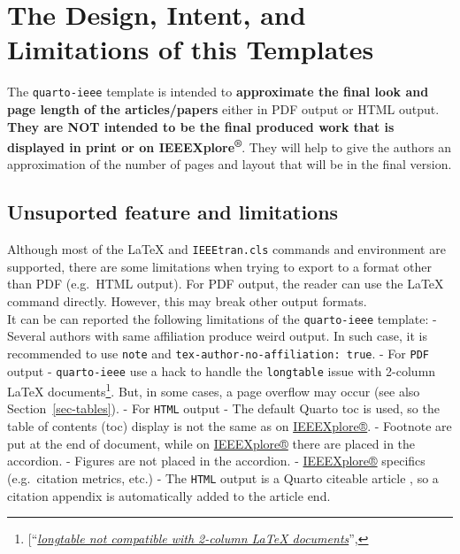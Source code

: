 \documentclass[
  journal,
]{IEEEtran}%
\theoremstyle{plain}
\theoremstyle{remark}
\begin{document}
\section{The Design, Intent, and Limitations of this
Templates}\label{the-design-intent-and-limitations-of-this-templates}

The \texttt{quarto-ieee} template is intended to \textbf{approximate the
final look and page length of the articles/papers} either in PDF output
or HTML output. \textbf{They are NOT intended to be the final produced
work that is displayed in print or on IEEEXplore\textsuperscript{®}}.
They will help to give the authors an approximation of the number of
pages and layout that will be in the final version.

\subsection{Unsuported feature and
limitations}\label{unsuported-feature-and-limitations}

Although most of the {\LaTeX} and \texttt{IEEEtran.cls} commands and
environment are supported, there are some limitations when trying to
export to a format other than PDF (e.g.~HTML output). For PDF output,
the reader can use the {\LaTeX} command directly. However, this may
break other output formats.\\
It can be can reported the following limitations of the
\texttt{quarto-ieee} template: - Several authors with same affiliation
produce weird output. In such case, it is recommended to use
\texttt{note} and \texttt{tex-author-no-affiliation:\ true}. - For
\texttt{PDF} output - \texttt{quarto-ieee} use a hack to handle the
\texttt{longtable} issue with 2-column {\LaTeX} documents\footnote{{[}``\emph{\href{https://github.com/jgm/pandoc/issues/1023\%3E}{longtable
  not compatible with 2-column LaTeX documents}}'',}. But, in some
cases, a page overflow may occur (see also Section~\ref{sec-tables}). -
For \texttt{HTML} output - The default Quarto toc is used, so the table
of contents (toc) display is not the same as on
\href{https://ieeexplore.ieee.org/}{IEEEXplore®}. - Footnote are put at
the end of document, while on
\href{https://ieeexplore.ieee.org/}{IEEEXplore®} there are placed in the
accordion. - Figures are not placed in the accordion. -
\href{https://ieeexplore.ieee.org/}{IEEEXplore®} specifics
(e.g.~citation metrics, etc.) - The \texttt{HTML} output is a Quarto
citeable article , so a citation
appendix is automatically added to the article end.
\end{document}
